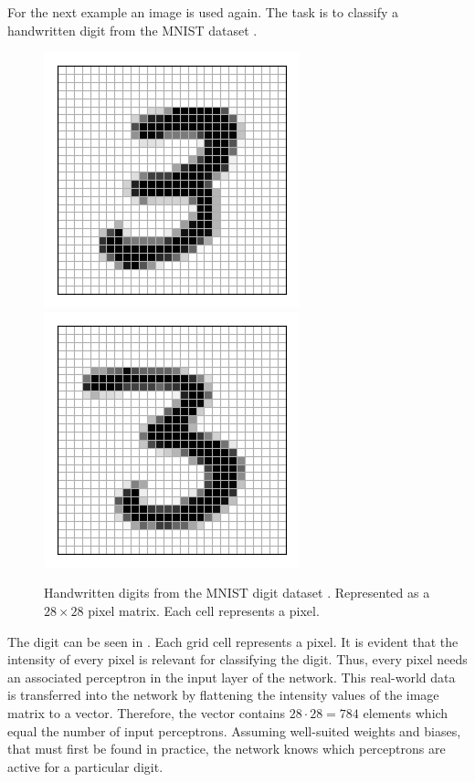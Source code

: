 For the next example an image is used again.
The task is to classify a handwritten digit from the MNIST dataset \cite{Lecun98}.
\begin{figure}
	\centering
	\includegraphics[]{images/mnist_digit_3a.png}
	\includegraphics[]{images/mnist_digit_3b.png}
	\caption[Handwritten digits from the MNIST digit dataset]{Handwritten digits from the MNIST digit dataset \cite{Lecun98}. Represented as a $28 \times 28$ pixel matrix. Each cell represents a pixel.}
	\label{fig:mnist-digit}
\end{figure}
The digit can be seen in .
Each grid cell represents a pixel.
It is evident that the intensity of every pixel is relevant for classifying the digit.
Thus, every pixel needs an associated perceptron in the input layer of the network.
This real-world data is transferred into the network by flattening the intensity values of the image matrix to a vector.
Therefore, the vector contains $28 \cdot 28 = 784$ elements which equal the number of input perceptrons.
Assuming well-suited weights and biases, that must first be found in practice, the network knows which perceptrons are active for a particular digit.
